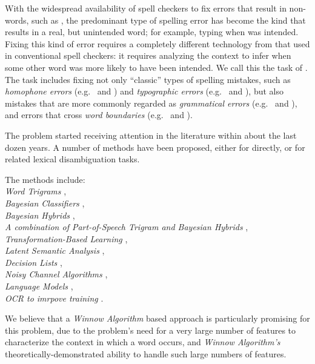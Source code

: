\sectionLabel{\projectTitle{}}

With the widespread availability of spell checkers to fix errors that result in
non-words, such as , the predominant type of spelling error has become
the kind that results in a real, but unintended word; for example, typing
 when  was intended. Fixing this kind of error requires a
completely different technology from that used in conventional spell checkers:
it requires analyzing the context to infer when some other word was more likely
to have been intended. We call this the task of \textit{\projectTitle{}}. The
task includes fixing not only ``classic'' types of spelling mistakes, such as
\textit{homophone errors} (e.g.\  and ) and
\textit{typographic errors} (e.g.\  and ), but also mistakes
that are more commonly regarded as \textit{grammatical errors} (e.g.\
 and ), and errors that cross \textit{word boundaries}
(e.g.\  and \ex{may be}).

The problem started receiving attention in the literature within about the last
dozen years. A number of methods have been proposed, either for
\textit{\projectTitle{}} directly, or for related lexical disambiguation tasks.

The methods include:\\\linebreak
\textit{Word Trigrams} \cite{Mays1991517},\\
\textit{Bayesian Classifiers} \cite{gale1992method},\\
\textit{Bayesian Hybrids} \cite{golding1996bayesian},\\
\textit{A combination of Part-of-Speech Trigram and Bayesian Hybrids}
\cite{golding1996combining},\\
\textit{Transformation-Based Learning} \cite{mangu1997automatic},\\
\textit{Latent Semantic Analysis} \cite{jones1997contextual},\\
\textit{Decision Lists} \cite{yarowsky2000hierarchical},\\
\textit{Noisy Channel Algorithms} \cite{brill2000improved},\\
\textit{Language Models} \cite{stehouwer2009language},\\
\textit{OCR to imrpove training} \cite{bassil2012post}.

We believe that a \textit{Winnow Algorithm} based approach is particularly
promising for this problem, due to the problem's need for a very large number
of features to characterize the context in which a word occurs, and
\textit{Winnow Algorithm's} theoretically-demonstrated ability to handle such
large numbers of features.
